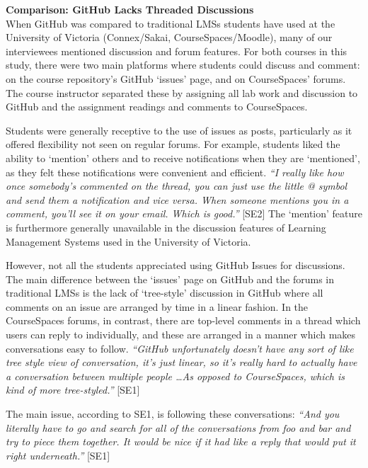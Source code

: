 \textbf{Comparison: GitHub Lacks Threaded Discussions} \\
When GitHub was compared to traditional LMSs students have used at the University of Victoria (Connex/Sakai, CourseSpaces/Moodle), many of our interviewees mentioned discussion and forum features. For both courses in this study, there were two main platforms where students could discuss and comment: on the course repository's GitHub `issues' page, and on CourseSpaces' forums. The course instructor separated these by assigning all lab work and discussion to GitHub and the assignment readings and comments to CourseSpaces.

Students were generally receptive to the use of issues as posts, particularly as it offered flexibility not seen on regular forums. For example, students liked the ability to `mention' others and to receive notifications when they are `mentioned', as they felt these notifications were convenient and efficient. \textit{``I really like how once somebody's commented on the thread, you can just use the little @ symbol and send them a notification and vice versa. When someone mentions you in a comment, you'll see it on your email. Which is good.''} [SE2] The `mention' feature is furthermore generally unavailable in the discussion features of Learning Management Systems used in the University of Victoria.

However, not all the students appreciated using GitHub Issues for discussions. The main difference between the `issues' page on GitHub and the forums in traditional LMSs is the lack of `tree-style' discussion in GitHub where all comments on an issue are arranged by time in a linear fashion. In the CourseSpaces forums, in contrast, there are top-level comments in a thread which users can reply to individually, and these are arranged in a manner which makes conversations easy to follow. \textit{``GitHub unfortunately doesn't have any sort of like tree style view of conversation, it's just linear, so it's really hard to actually have a conversation between multiple people \ldots As opposed to CourseSpaces, which is kind of more tree-styled.''} [SE1]

The main issue, according to SE1, is following these conversations: \textit{``And you literally have to go and search for all of the conversations from foo and bar and try to piece them together. It would be nice if it had like a reply that would put it right underneath.''} [SE1]


